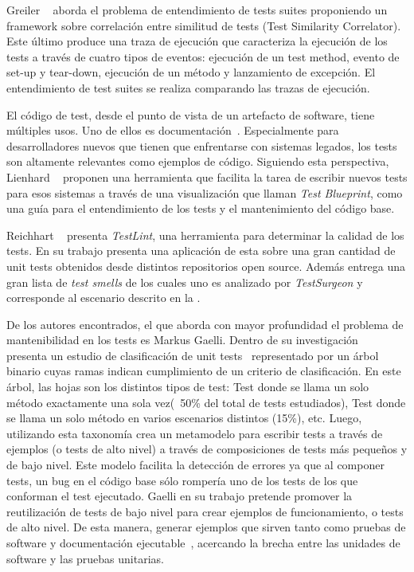\par Greiler \etal~\cite{Grei12a,greiler2012test} aborda el problema de entendimiento de tests suites proponiendo un framework sobre correlación entre similitud de tests (Test Similarity Correlator). Este último produce una traza de ejecución que caracteriza la ejecución de los tests a través de cuatro tipos de eventos: ejecución de un test method, evento de set-up y tear-down, ejecución de un método y lanzamiento de excepción. El entendimiento de test suites se realiza comparando las trazas de ejecución.

\par El código de test, desde el punto de vista de un artefacto de software, tiene múltiples usos. Uno de ellos es documentación~\cite{Kuhn08a}. Especialmente para desarrolladores nuevos que tienen que enfrentarse con sistemas legados, los tests son altamente relevantes como ejemplos de código. Siguiendo esta perspectiva, Lienhard \etal~\cite{Lien08a} proponen una herramienta que facilita la tarea de escribir nuevos tests para esos sistemas a través de una visualización que llaman \emph{Test Blueprint}, como una guía para el entendimiento de los tests y el mantenimiento del código base.  

\par Reichhart \etal~\cite{reichhart2007rule} presenta \emph{TestLint}, una herramienta para determinar la calidad de los tests. En su trabajo presenta una aplicación de esta sobre una gran cantidad de unit tests obtenidos desde distintos repositorios open source. Además entrega una gran lista de \emph{test smells} de los cuales uno es analizado por \emph{TestSurgeon} y corresponde al escenario descrito en la .

\par De los autores encontrados, el que aborda con mayor profundidad el problema de mantenibilidad en los tests es Markus Gaelli. Dentro de su investigación~\cite{gaelli2006composing,gaelli2007composing} presenta un estudio de clasificación de unit tests~\cite{gaelli2005towards} representado por un árbol binario cuyas ramas indican cumplimiento de un criterio de clasificación. En este árbol, las hojas son los distintos tipos de test: Test donde se llama un solo método exactamente una sola vez(~50\% del total de tests estudiados), Test donde se llama un solo método en varios escenarios distintos (15\%), etc. Luego, utilizando esta taxonomía crea un metamodelo para escribir tests a través de ejemplos (o tests de alto nivel) a través de composiciones de tests más pequeños y de bajo nivel. Este modelo facilita la detección de errores ya que al componer tests, un bug en el código base sólo rompería uno de los tests de los que conforman el test ejecutado. Gaelli en su trabajo pretende promover la reutilización de tests de bajo nivel para crear ejemplos de funcionamiento, o tests de alto nivel. De esta manera, generar ejemplos que sirven tanto como pruebas de software y documentación ejecutable~\cite{gaelli2006modeling}, acercando la brecha entre las unidades de software y las pruebas unitarias.

